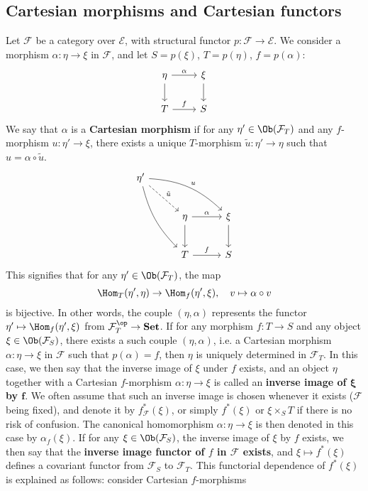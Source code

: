 \subsection{Cartesian morphisms and Cartesian functors}
Let $\mathcal{F}$ be a category over $\mathcal{E}$, with structural functor $p:\mathcal{F}\to \mathcal{E}$. We consider a morphism $\alpha:\eta\to \xi$ in $\mathcal{F}$, and let $S=p(\xi)$, $T=p(\eta)$, $f=p(\alpha)$:
\begin{equation}\label{fiber cat Cartesian diagram-1}
\begin{tikzcd}
\eta\ar[d]\ar[r,"\alpha"]&\xi\ar[d]\\
T\ar[r,"f"]&S
\end{tikzcd}
\end{equation}
We say that $\alpha$ is a \textbf{Cartesian morphism} if for any $\eta'\in\Ob(\mathcal{F}_T)$ and any $f$-morphism $u:\eta'\to \xi$, there exists a unique $T$-morphism $\tilde{u}:\eta'\to \eta$ such that $u=\alpha\circ\tilde{u}$.
\begin{equation}\label{fiber cat Cartesian diagram-2}
\begin{tikzcd}[row sep=8mm,column sep=10mm]
\eta'\ar[rdd,bend right=15pt]\ar[rd,dashed,"\tilde{u}"]\ar[rrd,"u",bend left=20pt]\\
&\eta\ar[r,"\alpha"]\ar[d]&\xi\ar[d]\\
&T\ar[r,"f"]&S
\end{tikzcd}
\end{equation}
This signifies that for any $\eta'\in\Ob(\mathcal{F}_T)$, the map
\begin{equation}\label{fiber cat Cartesian morphism represent Hom}
\Hom_T(\eta',\eta)\to \Hom_f(\eta',\xi),\quad v\mapsto\alpha\circ v
\end{equation}
is bijective. In other words, the couple $(\eta,\alpha)$ represents the functor $\eta'\mapsto\Hom_f(\eta',\xi)$ from $\mathcal{F}_T^{\op}\to \mathbf{Set}$. If for any morphism $f:T\to S$ and any object $\xi\in\Ob(\mathcal{F}_S)$, there exists a such couple $(\eta,\alpha)$, i.e. a Cartesian morphism $\alpha:\eta\to \xi$ in $\mathcal{F}$ such that $p(\alpha)=f$, then $\eta$ is uniquely determined in $\mathcal{F}_T$. In this case, we then say that the inverse image of $\xi$ under $f$ exists, and an object $\eta$ together with a Cartesian $f$-morphism $\alpha:\eta\to \xi$ is called an \textbf{inverse image of $\bm{\xi}$ by $\bm{f}$}. We often assume that such an inverse image is chosen whenever it exists ($\mathcal{F}$ being fixed), and denote it by $f^*_\mathcal{F}(\xi)$, or simply $f^*(\xi)$ or $\xi\times_ST$ if there is no risk of confusion. The canonical homomorphism $\alpha:\eta\to \xi$ is then denoted in this case by $\alpha_f(\xi)$. If for any $\xi\in\Ob(\mathcal{F}_S)$, the inverse image of $\xi$ by $f$ exists, we then say that the \textbf{inverse image functor of $f$ in $\mathcal{F}$ exists}, and $\xi\mapsto f^*(\xi)$ defines a covariant functor from $\mathcal{F}_S$ to $\mathcal{F}_T$. This functorial dependence of $f^*(\xi)$ is explained as follows: consider Cartesian $f$-morphisms
